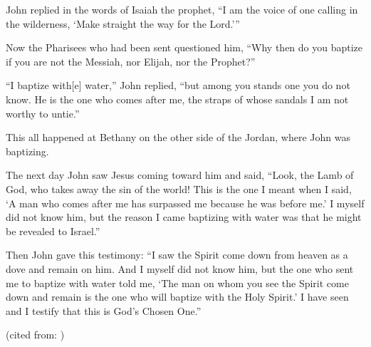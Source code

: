 \begin{englishabstract}
John replied in the words of Isaiah the prophet, “I am the voice of one calling in the wilderness, ‘Make straight the way for the Lord.’”

Now the Pharisees who had been sent  questioned him, “Why then do you baptize if you are not the Messiah, nor Elijah, nor the Prophet?”

 “I baptize with[e] water,” John replied, “but among you stands one you do not know.  He is the one who comes after me, the straps of whose sandals I am not worthy to untie.”

 This all happened at Bethany on the other side of the Jordan, where John was baptizing.

 The next day John saw Jesus coming toward him and said, “Look, the Lamb of God, who takes away the sin of the world!  This is the one I meant when I said, ‘A man who comes after me has surpassed me because he was before me.’  I myself did not know him, but the reason I came baptizing with water was that he might be revealed to Israel.”

 Then John gave this testimony: “I saw the Spirit come down from heaven as a dove and remain on him.  And I myself did not know him, but the one who sent me to baptize with water told me, ‘The man on whom you see the Spirit come down and remain is the one who will baptize with the Holy Spirit.’  I have seen and I testify that this is God’s Chosen One.”

(cited from: {})

\end{englishabstract}
